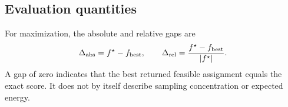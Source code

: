 \subsection{Evaluation quantities}

For maximization, the absolute and relative gaps are
\begin{equation}
\Delta_{\mathrm{abs}}=f^\star-f_{\mathrm{best}},
\qquad
\Delta_{\mathrm{rel}}=\frac{f^\star-f_{\mathrm{best}}}{|f^\star|}.
\label{eq:gaps}
\end{equation}
A gap of zero indicates that the best returned feasible assignment equals the exact score. It does not by itself describe sampling concentration or expected energy.
